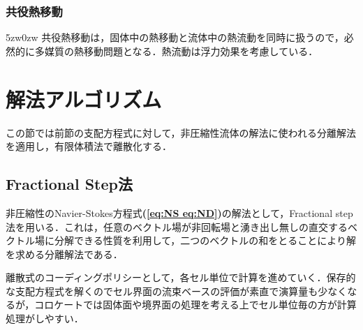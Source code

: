 \subsubsection{共役熱移動}
\begin{indentation}{5zw}{0zw}
\noindent 共役熱移動は，固体中の熱移動と流体中の熱流動を同時に扱うので，必然的に多媒質の熱移動問題となる．熱流動は浮力効果を考慮している．
\end{indentation}



%
\section{解法アルゴリズム}
\label{sec:Algorithm NS}
この節では前節の支配方程式に対して，非圧縮性流体の解法に使われる分離解法を適用し，有限体積法で離散化する．

\subsection{Fractional Step法}
\label{sec:fractional step}
非圧縮性のNavier-Stokes方程式\textbf{(\ref{eq:NS eq:ND})}の解法として，Fractional step法を用いる．これは，任意のベクトル場が非回転場と湧き出し無しの直交するベクトル場に分解できる性質を利用して，二つのベクトルの和をとることにより解を求める分離解法である．

離散式のコーディングポリシーとして，各セル単位で計算を進めていく．保存的な支配方程式を解くのでセル界面の流束ベースの評価が素直で演算量も少なくなるが，コロケートでは固体面や境界面の処理を考える上でセル単位毎の方が計算処理がしやすい．

%
